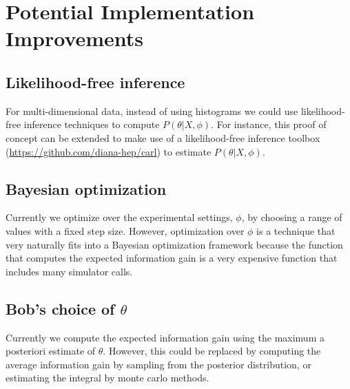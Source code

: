 \documentclass[10pt,journal,compsoc]{IEEEtran}
\begin{document}

\section{Potential Implementation Improvements}
\subsection{Likelihood-free inference}
For multi-dimensional data, instead of using histograms we could use likelihood-free inference techniques to compute $P(\theta | X, \phi)$. For instance, this proof of concept can be extended to make use of a likelihood-free inference toolbox (\url{https://github.com/diana-hep/carl}) to estimate $P(\theta | X, \phi)$.
\subsection{Bayesian optimization}
Currently we optimize over the experimental settings, $\phi$, by choosing a range of values with a fixed step size. However, optimization over $\phi$ is a technique that very naturally fits into a Bayesian optimization framework because the function that computes the expected information gain is a very expensive function that includes many simulator calls. 
\subsection{Bob's choice of $\theta$} 
Currently we compute the expected information gain using the maximum a posteriori estimate of $\theta$. However, this could be replaced by computing the average information gain by sampling from the posterior distribution, or estimating the integral by monte carlo methods.

 
\end{document}
